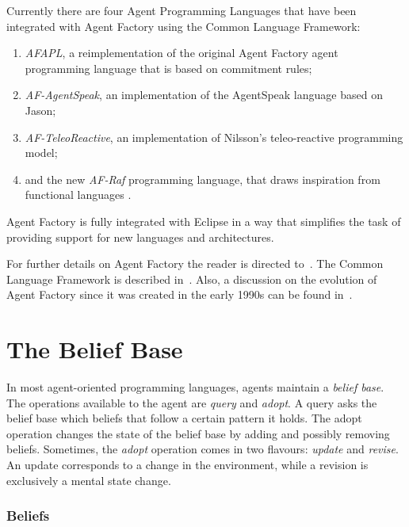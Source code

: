 \documentclass[a4paper,12pt,oneside,fleqn]{book} %
\begin{document}
Currently there are four Agent Programming Languages that have been
integrated with Agent Factory using the Common Language Framework:
\begin{enumerate}

\item \textit{AFAPL}, a reimplementation of the original Agent Factory
agent programming language that is based on commitment rules;

\item \textit{AF-AgentSpeak}, an implementation of the AgentSpeak language based on Jason;

\item \textit{AF-TeleoReactive}, an implementation of Nilsson's teleo-reactive
programming model;

\item and the new \textit{AF-Raf} programming language, that draws
inspiration from functional languages .
\end{enumerate}

Agent Factory is fully integrated with Eclipse in a way that simplifies
the task of providing support for new languages and architectures.

For further details on Agent Factory the reader is directed
to~\cite{collier2009modeling}. The Common Language Framework is described
in~\cite{russell2011af}. Also, a discussion on the evolution of Agent Factory since it
was created in the early 1990s can be found in~\cite{muldoon2009towards}.



\section{The Belief Base} %

In most agent-oriented programming languages, agents maintain a
\emph{belief base}.  The operations available to the agent are
\textit{query} and \textit{adopt}.  A query asks the belief base which
beliefs that follow a certain pattern it holds.  The adopt operation
changes the state of the belief base by adding and possibly removing
beliefs.  Sometimes, the {\it adopt\/} operation comes in two flavours:
{\it update\/} and {\it revise}.  An update corresponds to a change in the
environment, while a revision is exclusively a mental state change.

\subsubsection{Beliefs}
\end{document}
